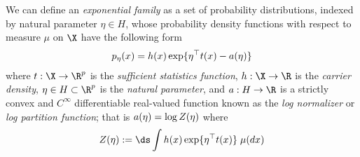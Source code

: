 \begin{definition}
We can define an \textit{exponential family} as a set of probability distributions, indexed by natural parameter $\eta \in H$,%
 whose probability density functions with respect to measure $\mu$ on $\X$ have the following form
\begin{align}
 p_\eta(x) = h(x) \exp \{ \eta^\top t(x) - a(\eta)\} 
\label{eqn:exponential_family_natural}
 \end{align}
where $\sufficientStatsFunction  : \X \to \R^p$ is the \textit{sufficient statistics function}, $h : \X \to \R$ is the \textit{carrier density}, $\eta \in H \subset \R^p$ is the \textit{natural parameter},  and $\logNormalizerFunction : H \to \R$ is a strictly convex and $C^{\infty}$ differentiable real-valued function known as the \textit{log normalizer} or \textit{log partition function};  that is $a(\eta) = \log Z(\eta)$ where 
\begin{equation}
\label{eqn:partition_function}
 Z(\eta) := \ds\int  h(x) \exp \{ \eta^\top \sufficientStatsFunction(x)  \} \; \mu(dx)	
\end{equation}



\end{definition}
